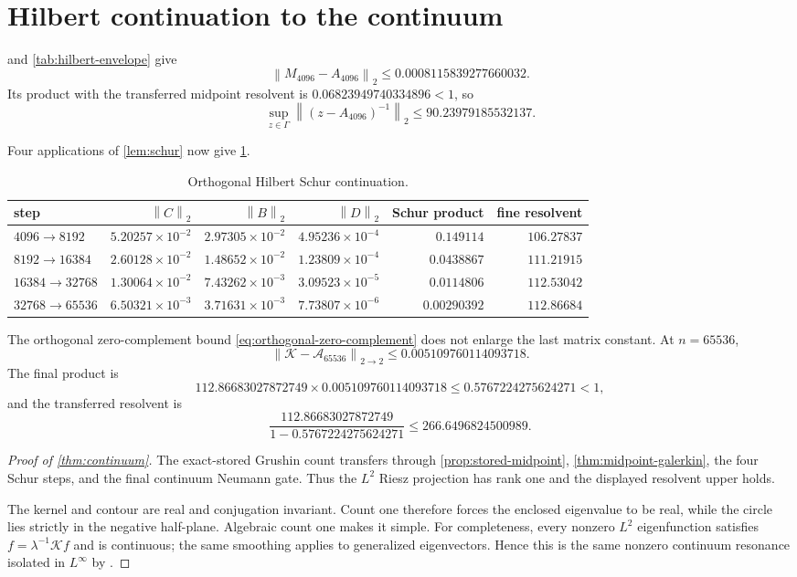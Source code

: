 \documentclass[11pt]{article}
\theoremstyle{definition}
\theoremstyle{remark}
\newcommand{\cA}{\mathcal A}
\newcommand{\cK}{\mathcal K}
\newcommand{\norm}[1]{\left\lVert #1\right\rVert}
\begin{document}
\section{Hilbert continuation to the continuum}
\label{sec:composition}

 and \cref{tab:hilbert-envelope} give
\[
 \norm{M_{4096}-A_{4096}}_2
 \le0.0008115839277660032.
\]
Its product with the transferred midpoint resolvent is
$0.06823949740334896<1$, so
\[
 \sup_{z\in\Gamma}\norm{(z-A_{4096})^{-1}}_2
 \le90.23979185532137.
\]

Four applications of \cref{lem:schur} now give
\cref{tab:schur-chain}.

\begin{table}[H]
\centering
\caption{Orthogonal Hilbert Schur continuation.}
\label{tab:schur-chain}
\small
\setlength{\tabcolsep}{4pt}
\begin{tabular}{@{}lrrrrr@{}}
\toprule
step & $\norm C_2$ & $\norm B_2$ & $\norm D_2$
& Schur product & fine resolvent\\
\midrule
$4096\to8192$
& $5.20257{\times}10^{-2}$ & $2.97305{\times}10^{-2}$
& $4.95236{\times}10^{-4}$ & $0.149114$ & $106.27837$\\
$8192\to16384$
& $2.60128{\times}10^{-2}$ & $1.48652{\times}10^{-2}$
& $1.23809{\times}10^{-4}$ & $0.0438867$ & $111.21915$\\
$16384\to32768$
& $1.30064{\times}10^{-2}$ & $7.43262{\times}10^{-3}$
& $3.09523{\times}10^{-5}$ & $0.0114806$ & $112.53042$\\
$32768\to65536$
& $6.50321{\times}10^{-3}$ & $3.71631{\times}10^{-3}$
& $7.73807{\times}10^{-6}$ & $0.00290392$ & $112.86684$\\
\bottomrule
\end{tabular}
\end{table}

The orthogonal zero-complement bound
\eqref{eq:orthogonal-zero-complement} does not enlarge the last matrix
constant.  At $n=65536$,
\[
 \norm{\cK-\cA_{65536}}_{2\to2}
 \le0.005109760114093718.
\]
The final product is
\[
 112.86683027872749
 \times0.005109760114093718
 \le0.5767224275624271<1,
\]
and the transferred resolvent is
\[
 \frac{112.86683027872749}{1-0.5767224275624271}
 \le266.6496824500989.
\]

\begin{proof}[Proof of \cref{thm:continuum}]
The exact-stored Grushin count transfers through
\cref{prop:stored-midpoint}, \cref{thm:midpoint-galerkin}, the four Schur
steps, and the final continuum Neumann gate.  Thus the $L^2$ Riesz
projection has rank one and the displayed resolvent upper holds.

The kernel and contour are real and conjugation invariant.  Count one
therefore forces the enclosed eigenvalue to be real, while the circle lies
strictly in the negative half-plane.  Algebraic count one makes it simple.
For completeness, every nonzero $L^2$ eigenfunction satisfies
$f=\lambda^{-1}\cK f$ and is continuous; the same smoothing applies to
generalized eigenvectors.  Hence this is the same nonzero continuum
resonance isolated in $L^\infty$ by
\citet{WangContinuumContour2026}.
\end{proof}
\end{document}
